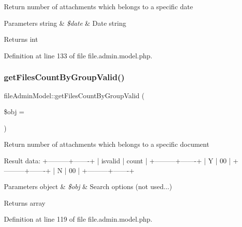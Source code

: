 Return number of attachments which belongs to a specific date


\begin{DoxyParams}[1]{Parameters}
string & {\em \$date} & Date string \\
\hline
\end{DoxyParams}
\begin{DoxyReturn}{Returns}
int 
\end{DoxyReturn}


Definition at line 133 of file file.\+admin.\+model.\+php.

\mbox{\label{classfileAdminModel_aae3d004799fc86f576b61d96424fb1fa}} 
\subsubsection{\texorpdfstring{get\+Files\+Count\+By\+Group\+Valid()}{getFilesCountByGroupValid()}}
{\footnotesize\ttfamily file\+Admin\+Model\+::get\+Files\+Count\+By\+Group\+Valid (\begin{DoxyParamCaption}\item[{}]{\$obj = {\ttfamily \textquotesingle{}\textquotesingle{}} }\end{DoxyParamCaption})}

Return number of attachments which belongs to a specific document


\begin{DoxyPre}
Result data:
+---------+-------+
| isvalid | count |
+---------+-------+
| Y       | 00    |
+---------+-------+
| N       | 00    |
+---------+-------+
\end{DoxyPre}



\begin{DoxyParams}[1]{Parameters}
object & {\em \$obj} & Search options (not used...) \\
\hline
\end{DoxyParams}
\begin{DoxyReturn}{Returns}
array 
\end{DoxyReturn}


Definition at line 119 of file file.\+admin.\+model.\+php.

\mbox{\label{classfileAdminModel_a043ae7934f6fb3bb6ef24bff36a63795}} 
